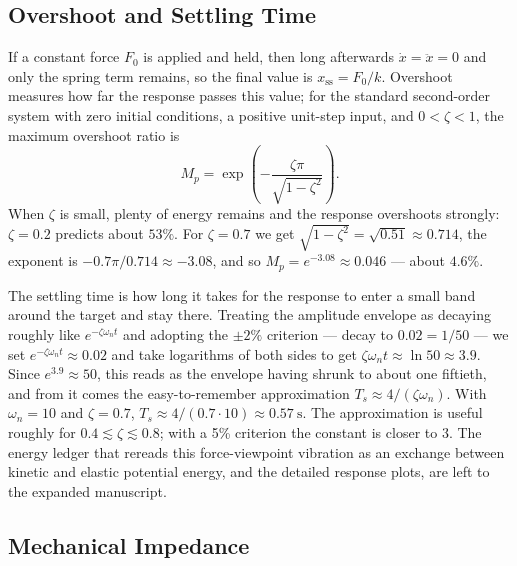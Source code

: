 \subsection{Overshoot and Settling Time}

If a constant force $F_0$ is applied and held, then long afterwards
$\dot{x}=\ddot{x}=0$ and only the spring term remains, so the final value
is $x_{\mathrm{ss}}=F_0/k$.
Overshoot measures how far the response passes this value; for the
standard second-order system with zero initial conditions, a positive
unit-step input, and $0<\zeta<1$, the maximum overshoot ratio is
\begin{equation}
  M_p=\exp\!\left(-\frac{\zeta\pi}{\sqrt{1-\zeta^2}}\right).
  \label{eq:u5m-overshoot}
\end{equation}
When $\zeta$ is small, plenty of energy remains and the response
overshoots strongly: $\zeta=0.2$ predicts about $53\%$.
For $\zeta=0.7$ we get $\sqrt{1-\zeta^2}=\sqrt{0.51}\approx0.714$, the
exponent is $-0.7\pi/0.714\approx-3.08$, and so
$M_p=e^{-3.08}\approx0.046$ --- about $4.6\%$.

The settling time is how long it takes for the response to enter a small
band around the target and stay there.
Treating the amplitude envelope as decaying roughly like
$e^{-\zeta\omega_n t}$ and adopting the $\pm2\%$ criterion --- decay to
$0.02=1/50$ --- we set $e^{-\zeta\omega_n t}\approx0.02$ and take
logarithms of both sides to get
$\zeta\omega_n t\approx\ln 50\approx3.9$.
Since $e^{3.9}\approx50$, this reads as the envelope having shrunk to
about one fiftieth, and from it comes the easy-to-remember approximation
$T_s\approx 4/(\zeta\omega_n)$.
With $\omega_n=10$ and $\zeta=0.7$,
$T_s\approx4/(0.7\cdot10)\approx0.57~\mathrm{s}$.
The approximation is useful roughly for $0.4\lesssim\zeta\lesssim0.8$;
with a 5\% criterion the constant is closer to 3.
The energy ledger that rereads this force-viewpoint vibration as an
exchange between kinetic and elastic potential energy, and the detailed
response plots, are left to the expanded manuscript.

\subsection{Mechanical Impedance}

